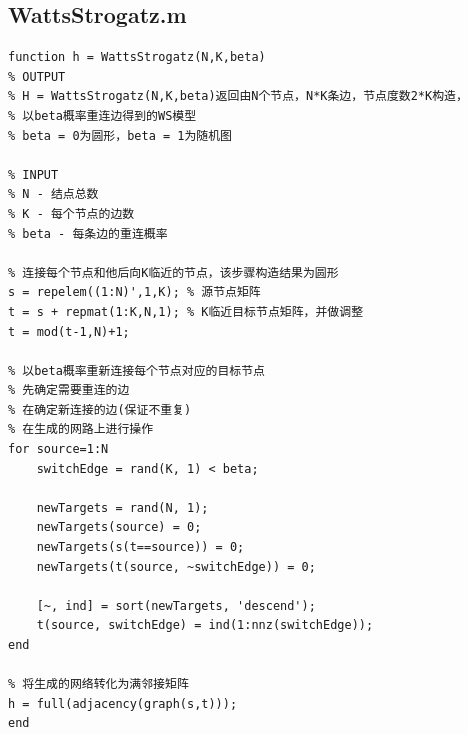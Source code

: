 \documentclass[supercite]{HustGraduPaper}
\begin{document}
	\subsection{WattsStrogatz.m}
	\begin{lstlisting}
function h = WattsStrogatz(N,K,beta)
% OUTPUT
% H = WattsStrogatz(N,K,beta)返回由N个节点，N*K条边，节点度数2*K构造，
% 以beta概率重连边得到的WS模型
% beta = 0为圆形，beta = 1为随机图

% INPUT
% N - 结点总数
% K - 每个节点的边数
% beta - 每条边的重连概率

% 连接每个节点和他后向K临近的节点，该步骤构造结果为圆形
s = repelem((1:N)',1,K); % 源节点矩阵
t = s + repmat(1:K,N,1); % K临近目标节点矩阵，并做调整
t = mod(t-1,N)+1;

% 以beta概率重新连接每个节点对应的目标节点
% 先确定需要重连的边
% 在确定新连接的边(保证不重复)
% 在生成的网路上进行操作
for source=1:N    
    switchEdge = rand(K, 1) < beta;
    
    newTargets = rand(N, 1);
    newTargets(source) = 0;
    newTargets(s(t==source)) = 0;
    newTargets(t(source, ~switchEdge)) = 0;
    
    [~, ind] = sort(newTargets, 'descend');
    t(source, switchEdge) = ind(1:nnz(switchEdge));
end

% 将生成的网络转化为满邻接矩阵
h = full(adjacency(graph(s,t)));
end
	\end{lstlisting}
\end{document}
